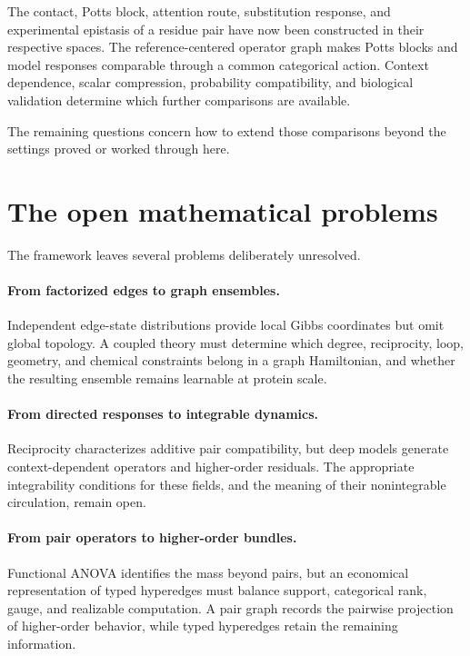 The contact, Potts block, attention route, substitution response, and experimental epistasis of a
residue pair have now been constructed in their respective spaces.  The
reference-centered operator graph makes Potts blocks and model responses comparable through a
common categorical action.  Context dependence, scalar compression, probability compatibility,
and biological validation determine which further comparisons are available.

The remaining questions concern how to extend those comparisons beyond the settings proved or
worked through here.

\section{The open mathematical problems}

The framework leaves several problems deliberately unresolved.

\paragraph{From factorized edges to graph ensembles.}
Independent edge-state distributions provide local Gibbs coordinates but omit global topology.
A coupled theory must determine which degree, reciprocity, loop, geometry, and chemical constraints
belong in a graph Hamiltonian, and whether the resulting ensemble remains learnable at protein
scale.

\paragraph{From directed responses to integrable dynamics.}
Reciprocity characterizes additive pair compatibility, but deep models generate context-dependent
operators and higher-order residuals.  The appropriate integrability conditions for these fields,
and the meaning of their nonintegrable circulation, remain open.

\paragraph{From pair operators to higher-order bundles.}
Functional ANOVA identifies the mass beyond pairs, but an economical representation of typed
hyperedges must balance support, categorical rank, gauge, and realizable computation.  A pair
graph records the pairwise projection of higher-order behavior, while typed hyperedges retain the
remaining information.

